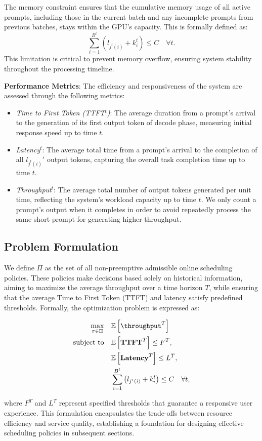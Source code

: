 The memory constraint ensures that the cumulative memory usage of all active prompts, including those in the current batch and any incomplete prompts from previous batches, stays within the GPU's capacity. This is formally defined as:
\[
\sum_{i=1}^{B^t} (l_{j^t(i)} + k_i^t) \leq C \quad \forall t.
\]
This limitation is critical to prevent memory overflow, ensuring system stability throughout the processing timeline.

\textbf{Performance Metrics}: The efficiency and responsiveness of the system are assessed through the following metrics:
\begin{itemize}
    \item \textit{Time to First Token (TTFT\(^t\))}: The average duration from a prompt's arrival to the generation of its first output token of decode phase, measuring initial response speed up to time \( t \).
    \item \textit{Latency\(^t\)}: The average total time from a prompt's arrival to the completion of all \( l_{j^t(i)}' \) output tokens, capturing the overall task completion time up to time \( t \).
    \item \textit{Throughput\(^t\)}: The average total number of output tokens generated per unit time, reflecting the system's workload capacity up to time \( t \). We only count a prompt's output when it completes in order to avoid repeatedly process the same short prompt for generating higher throughput.
\end{itemize}

\subsection{Problem Formulation}

We define \( \Pi \) as the set of all non-preemptive admissible online scheduling policies. These policies make decisions based solely on historical information, aiming to maximize the average throughput over a time horizon \( T \), while ensuring that the average Time to First Token (TTFT) and latency satisfy predefined thresholds. Formally, the optimization problem is expressed as:

\[
\begin{aligned}
\max_{\pi \in \Pi} \quad & \mathbb{E} \left[ \throughput^T \right] \\
\text{subject to} \quad & \mathbb{E} \left[ \textbf{TTFT}^T \right] \leq F^T, \\
& \mathbb{E} \left[ \textbf{Latency}^T \right] \leq L^T, \\
& \sum_{i=1}^{B^t} \left( l_{j^t(i)} + k_i^t \right) \leq C \quad \forall t,
\end{aligned}
\]

where \( F^T \) and \( L^T \) represent specified thresholds that guarantee a responsive user experience. This formulation encapsulates the trade-offs between resource efficiency and service quality, establishing a foundation for designing effective scheduling policies in subsequent sections.

